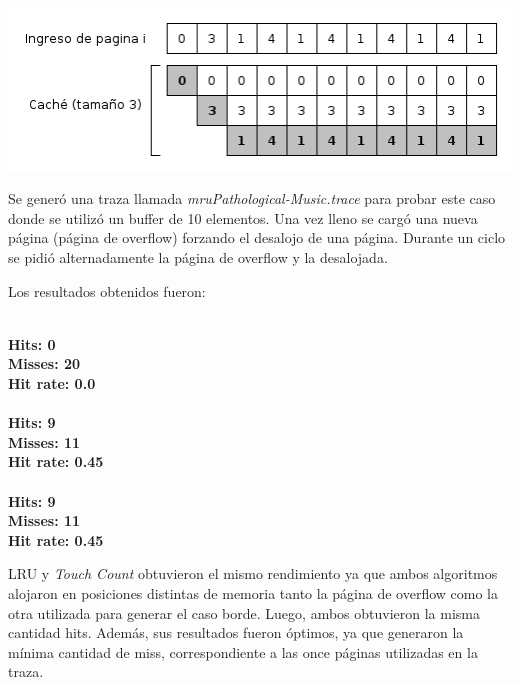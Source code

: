\documentclass[11pt, a4paper, spanish]{article}
\begin{document}
	\begin{center}
	\includegraphics[scale=0.65]{diagramas/MRUPathological.png}\\
	\end{center}


Se gener\'o una traza llamada \textit{mruPathological-Music.trace} para probar este caso donde se utiliz\'o un buffer de 10 elementos. Una vez lleno se carg\'o una nueva p\'agina (p\'agina de overflow) forzando el desalojo de una p\'agina. Durante un ciclo se pidi\'o alternadamente la p\'agina de overflow y la desalojada.

Los resultados obtenidos fueron:\\

\begin{multicols}{3}

\\
\textbf{Hits: 0}\\
\textbf{Misses: 20}\\
\textbf{Hit rate: 0.0}\\

\\
\textbf{Hits: 9}\\
\textbf{Misses: 11}\\
\textbf{Hit rate: 0.45}\\

\\
\textbf{Hits: 9}\\
\textbf{Misses: 11}\\
\textbf{Hit rate: 0.45}\\

\end{multicols}

LRU y \textit{Touch Count} obtuvieron el mismo rendimiento ya que ambos algoritmos alojaron en posiciones distintas de memoria tanto la p\'agina de overflow como la otra utilizada para generar el caso borde. Luego, ambos obtuvieron la misma cantidad hits. Adem\'as, sus resultados fueron \'optimos, ya que generaron la m\'inima cantidad de miss, correspondiente a las once p\'aginas utilizadas en la traza.\\
\end{document}
